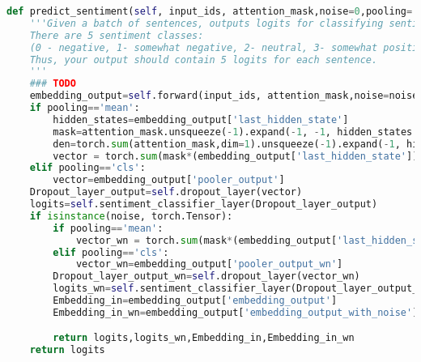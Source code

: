 \begin{lstlisting}[language=Python, caption={predict sentiment method in Multitask BERT class}, label={lst:predict_sentiment}, basicstyle=\ttfamily\small, keywordstyle=\color{blue}, commentstyle=\color{green}, stringstyle=\color{red},linewidth=\textwidth]
def predict_sentiment(self, input_ids, attention_mask,noise=0,pooling='mean'):
    '''Given a batch of sentences, outputs logits for classifying sentiment.
    There are 5 sentiment classes:
    (0 - negative, 1- somewhat negative, 2- neutral, 3- somewhat positive, 4- positive)
    Thus, your output should contain 5 logits for each sentence.
    '''
    ### TODO
    embedding_output=self.forward(input_ids, attention_mask,noise=noise)
    if pooling=='mean':
        hidden_states=embedding_output['last_hidden_state']
        mask=attention_mask.unsqueeze(-1).expand(-1, -1, hidden_states.shape[2]).float()
        den=torch.sum(attention_mask,dim=1).unsqueeze(-1).expand(-1, hidden_states.shape[2])+1e-9
        vector = torch.sum(mask*(embedding_output['last_hidden_state']), dim=1)/den
    elif pooling=='cls':
        vector=embedding_output['pooler_output']
    Dropout_layer_output=self.dropout_layer(vector)
    logits=self.sentiment_classifier_layer(Dropout_layer_output) 
    if isinstance(noise, torch.Tensor):
        if pooling=='mean':
            vector_wn = torch.sum(mask*(embedding_output['last_hidden_state_wn']), dim=1)/den
        elif pooling=='cls':
            vector_wn=embedding_output['pooler_output_wn']
        Dropout_layer_output_wn=self.dropout_layer(vector_wn)
        logits_wn=self.sentiment_classifier_layer(Dropout_layer_output_wn)
        Embedding_in=embedding_output['embedding_output']
        Embedding_in_wn=embedding_output['embedding_output_with_noise']

        return logits,logits_wn,Embedding_in,Embedding_in_wn
    return logits
\end{lstlisting}



